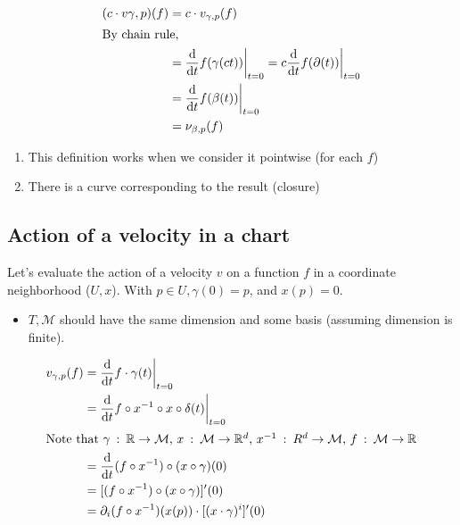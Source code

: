 \documentclass[10pt]{article}
\newcommand{\R}{\mathbb{R}}
\newcommand{\dd}{\text{d}}
\begin{document}
\begin{align*}
    (c \cdot v{\gamma, p})(f) &= c \cdot v_{\gamma, p}(f)\\
    \intertext{By chain rule,}
    &= \frac{\text{d}}{\text{d}t} f(\gamma(ct)) \bigg|_{t = 0} = c \frac{\text{d}}{\text{d}t} f(\partial(t)) \bigg|_{t = 0}\\
    &= \frac{\dd}{\dd t}f(\beta(t)) \bigg|_{t = 0}\\
    &= \nu_{\beta, p}(f)
\end{align*}
\begin{enumerate}
    \item This definition works when we consider it pointwise (for each $f$)
    \item There is a curve corresponding to the result (closure)
\end{enumerate}

\subsection*{Action of a velocity in a chart}
Let's evaluate the action of a velocity $v$ on a function $f$ in a coordinate neighborhood ($U, x$).  With $p \in U, \gamma(0) = p$, and $x(p) = 0$.
\begin{itemize}
    \item $T, \mathcal{M}$ should have the same dimension and some basis (assuming dimension is finite).
\end{itemize}
\begin{align*}
    v_{\gamma, p}(f) &= \frac{\text{d}}{\text{d}t}f \cdot \gamma(t) \bigg|_{t = 0} \\
    &= \frac{\text{d}}{\text{d}t} f \circ x^{-1} \circ x \circ \delta(t) \bigg|_{t = 0}\\
    \intertext{Note that $\gamma \::\: \R \rightarrow \mathcal{M}$, $x \::\: \mathcal{M} \rightarrow \R^d$, $x^{-1} \::\: R^d \rightarrow \mathcal{M}$, $f \::\: \mathcal{M} \rightarrow \R$}
    &= \frac{\text{d}}{\text{d}t} (f \circ x^{-1}) \circ (x \circ \gamma)(0) \\
    &= [(f \circ x^{-1}) \circ (x \circ \gamma)]'(0)\\
    &= \partial_i (f \circ x^{-1})(x(p)) \cdot [(x \cdot \gamma)^i]'(0)
\end{align*}
\end{document}
